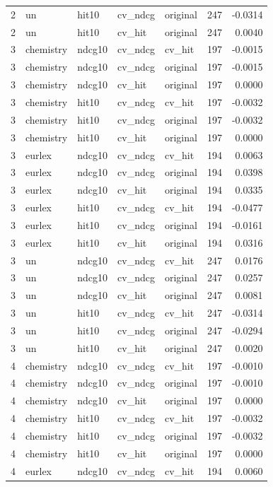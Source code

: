\begin{tabular}{rllllrr}
2 & un & hit10 & cv\_ndcg & original & 247 & -0.0314 \\
2 & un & hit10 & cv\_hit & original & 247 & 0.0040 \\
3 & chemistry & ndcg10 & cv\_ndcg & cv\_hit & 197 & -0.0015 \\
3 & chemistry & ndcg10 & cv\_ndcg & original & 197 & -0.0015 \\
3 & chemistry & ndcg10 & cv\_hit & original & 197 & 0.0000 \\
3 & chemistry & hit10 & cv\_ndcg & cv\_hit & 197 & -0.0032 \\
3 & chemistry & hit10 & cv\_ndcg & original & 197 & -0.0032 \\
3 & chemistry & hit10 & cv\_hit & original & 197 & 0.0000 \\
3 & eurlex & ndcg10 & cv\_ndcg & cv\_hit & 194 & 0.0063 \\
3 & eurlex & ndcg10 & cv\_ndcg & original & 194 & 0.0398 \\
3 & eurlex & ndcg10 & cv\_hit & original & 194 & 0.0335 \\
3 & eurlex & hit10 & cv\_ndcg & cv\_hit & 194 & -0.0477 \\
3 & eurlex & hit10 & cv\_ndcg & original & 194 & -0.0161 \\
3 & eurlex & hit10 & cv\_hit & original & 194 & 0.0316 \\
3 & un & ndcg10 & cv\_ndcg & cv\_hit & 247 & 0.0176 \\
3 & un & ndcg10 & cv\_ndcg & original & 247 & 0.0257 \\
3 & un & ndcg10 & cv\_hit & original & 247 & 0.0081 \\
3 & un & hit10 & cv\_ndcg & cv\_hit & 247 & -0.0314 \\
3 & un & hit10 & cv\_ndcg & original & 247 & -0.0294 \\
3 & un & hit10 & cv\_hit & original & 247 & 0.0020 \\
4 & chemistry & ndcg10 & cv\_ndcg & cv\_hit & 197 & -0.0010 \\
4 & chemistry & ndcg10 & cv\_ndcg & original & 197 & -0.0010 \\
4 & chemistry & ndcg10 & cv\_hit & original & 197 & 0.0000 \\
4 & chemistry & hit10 & cv\_ndcg & cv\_hit & 197 & -0.0032 \\
4 & chemistry & hit10 & cv\_ndcg & original & 197 & -0.0032 \\
4 & chemistry & hit10 & cv\_hit & original & 197 & 0.0000 \\
4 & eurlex & ndcg10 & cv\_ndcg & cv\_hit & 194 & 0.0060 \\

\end{tabular}
